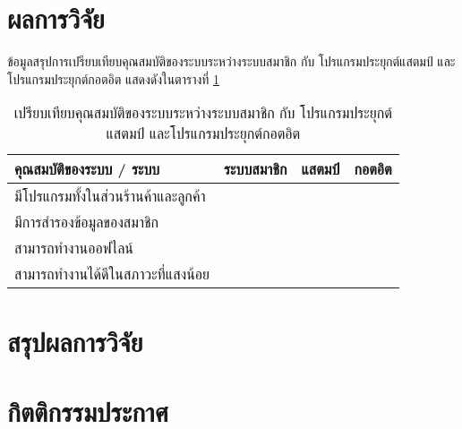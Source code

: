 \documentclass[12pt,a4paper,twocolumn]{article}
\newcommand{\cmark}{\ding{51}}
\newcommand{\xmark}{\ding{55}}
\begin{document}
\section{ผลการวิจัย}

ข้อมูลสรุปการเปรียบเทียบคุณสมบัติของระบบระหว่างระบบสมาชิก กับ โปรแกรมประยุกต์แสตมป์ และโปรแกรมประยุกต์กอตอิต แสดงดังในตารางที่ \ref{tab:compare_feature}

\begin{table}[ht!]
\centering
\resizebox{81mm}{!} {
\begin{tabular}{ | l | c | c | c |}
	\hline                        
  	คุณสมบัติของระบบ / ระบบ            & ระบบสมาชิก & แสตมป์ & กอตอิต \\
  	\hline 
  	มีโปรแกรมทั้งในส่วนร้านค้าและลูกค้า 		& \cmark & \xmark & \xmark \\
  	\hline
  	มีการสำรองข้อมูลของสมาชิก				    & \cmark & \cmark & \cmark \\
  	\hline
  	สามารถทำงานออฟไลน์                 & \cmark & \cmark & \cmark \\
  	\hline
  	สามารถทำงานได้ดีในสภาวะที่แสงน้อย    & \cmark & \cmark & \xmark \\
  	\hline
\end{tabular}
}
\caption{เปรียบเทียบคุณสมบัติของระบบระหว่างระบบสมาชิก กับ โปรแกรมประยุกต์แสตมป์ และโปรแกรมประยุกต์กอตอิต}
\label{tab:compare_feature}
\end{table}

\section{สรุปผลการวิจัย}

\section{กิตติกรรมประกาศ}



\end{document}
